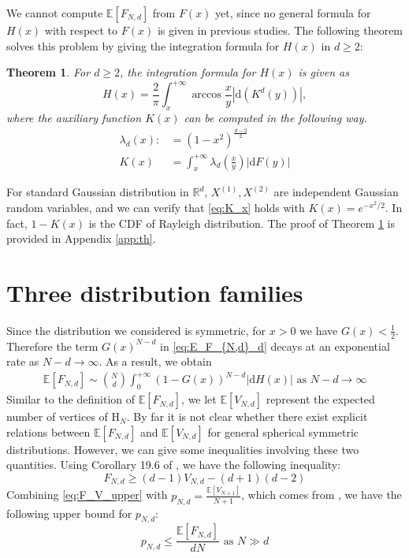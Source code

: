 \documentclass[conference,a4paper]{IEEEtran}
\def\E{\mathbb{E}}
\def\R{\mathbb{R}}
\def\dd{\mathrm{d}}
\newtheorem{theorem}{Theorem}
\begin{document}
We cannot compute $\E[F_{N,d}]$ from $F(x)$ yet, since no general formula for $H(x)$ with respect to $F(x)$ is given in previous studies.
The following theorem solves this problem by giving the integration formula for $H(x)$ in $d\geq 2$:
\begin{theorem}\label{thm:H}
For $d\geq 2$, the integration formula for $H(x)$ is given as
\begin{equation}
     H(x) = \frac{2}{\pi}
     \int_x^{+\infty} \arccos\frac{x}{y}
     |\mathrm{d} (K^d(y))|, \label{eq:H_expression_d_dim}
\end{equation}
where the auxiliary function $K(x)$ can be computed in the following way.
\begin{align}
     \lambda_d(x)  :&=(1-x^2)^{\frac{d-2}{2}}
     \label{eq:lambda_r}\\
     K(x)&=
        \int_x^{+\infty} 
     \lambda_d \left(\frac{x}{y} \right)|\dd F(y)|
     \label{eq:K_x}
\end{align}
\end{theorem}
For standard Gaussian distribution in $\R^d$,
$X^{(1)}, X^{(2)}$ are independent
Gaussian random variables, and we can verify that \eqref{eq:K_x} holds with $K(x) = e^{-x^2/2}$.
In fact, $1-K(x)$ is the CDF of Rayleigh distribution.
The proof of Theorem \ref{thm:H}
is provided in Appendix \ref{app:th}.
\section{Three distribution families}\label{sec:three_distriutions}
Since the distribution we considered is symmetric,
for $x>0$ we have $G(x)<\frac{1}{2}$. Therefore the
term $G(x)^{N-d}$ in \eqref{eq:E_F_{N,d}_d} decays at an exponential rate as $N-d\to \infty$.
As a result, we obtain
\begin{align}
     \E[F_{N,d}] \sim \binom{N}{d} \int_0^{+\infty} 
      (1-G(x))^{N-d} |\dd H(x)| \textrm{ as } N-d\to \infty
     \label{eq:E_F_N_d_d_sim}
\end{align}
Similar to the definition of $\E[F_{N,d}]$,
we let $\E[V_{N,d}]$ represent the expected number of
vertices of $\mathrm{H}_N$.
By far it is not clear whether there exist explicit relations
between $\E[F_{N,d}]$ and $\E[V_{N,d}]$
for general spherical symmetric distributions.
However, we can give some inequalities involving these two
quantities. Using Corollary 19.6 of \cite{brondsted2012introduction}, we have the following
inequality:
\begin{equation}\label{eq:F_V_upper}
     F_{N,d} \geq (d-1) V_{N,d} - (d+1)(d-2)
 \end{equation}
Combining \eqref{eq:F_V_upper} with $p_{N,d} = \frac{\E[V_{N+1}]}{N+1}$, which comes from
\cite{efron1965convex}, we have the following upper bound for $p_{N,d}$:
\begin{equation}\label{eq:p_N_d_bound}
    p_{N,d} \leq \frac{\E[F_{N,d}]}{d N} \textrm{ as } N \gg d
\end{equation}
\end{document}
